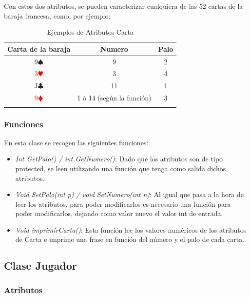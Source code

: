 Con estos dos atributos, se pueden caracterizar cualquiera de las 52 cartas de la baraja francesa, como, por ejemplo:

\begin{longtable}[c]{|c|c|c|}
\hline
\rowcolor{lightgray}Carta de la baraja &Numero&Palo\\
 \hline
9$\spadesuit$&9&2\\
\hline
\textcolor{red}{3$\varheartsuit$}&3&4\\
\hline
J$\clubsuit$&11&1\\
\hline
\textcolor{red}{9$\vardiamondsuit$}&1 ó 14 (según la función)&3\\
\hline
\caption{Ejemplos de Atributos Carta}
\label{tab:carta}
\end{longtable}

\subsubsection{Funciones}
En esta clase se recogen las siguientes funciones:
\begin{itemize}
\item \textit{Int GetPalo() / int GetNumero()}: Dado que los atributos son de tipo protected, se leen utilizando una función que tenga como salida dichos atributos.
\item\textit{ Void SetPalo(int p) / void SetNumero(int n)}: Al igual que pasa a la hora de leer los atributos, para poder modificarlos es necesario una función para poder modificarlos, dejando como valor nuevo el valor int de entrada.
\item \textit{Void imprimirCarta()}: Esta función lee los valores numéricos de los atributos de Carta e imprime una frase en función del número y el palo de cada carta.
 \end{itemize}

\subsection{Clase Jugador}
\subsubsection{Atributos}

